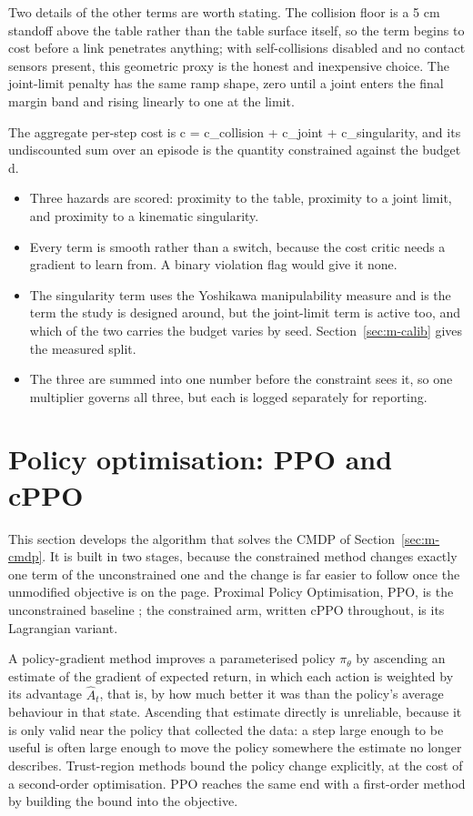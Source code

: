 Two details of the other terms are worth stating. The collision floor is a 5 cm standoff above the
table rather than the table surface itself, so the term begins to cost before a link penetrates
anything; with self-collisions disabled and no contact sensors present, this geometric proxy is the
honest and inexpensive choice. The joint-limit penalty has the same ramp shape, zero until a joint
enters the final margin band and rising linearly to one at the limit.

The aggregate per-step cost is c = c\_collision + c\_joint + c\_singularity, and its undiscounted sum
over an episode is the quantity constrained against the budget d.

\begin{keypoints}
\begin{itemize}\tightlist
\item Three hazards are scored: proximity to the table, proximity to a joint limit, and proximity to
a kinematic singularity.
\item Every term is smooth rather than a switch, because the cost critic needs a gradient to learn
from. A binary violation flag would give it none.
\item The singularity term uses the Yoshikawa manipulability measure and is the term the study is
designed around, but the joint-limit term is active too, and which of the two carries the budget
varies by seed. Section~\ref{sec:m-calib} gives the measured split.
\item The three are summed into one number before the constraint sees it, so one multiplier governs
all three, but each is logged separately for reporting.
\end{itemize}
\end{keypoints}

\section{Policy optimisation: PPO and cPPO}\label{sec:m-cppo}

This section develops the algorithm that solves the CMDP of Section~\ref{sec:m-cmdp}. It is built in
two stages, because the constrained method changes exactly one term of the unconstrained one and the
change is far easier to follow once the unmodified objective is on the page. Proximal Policy
Optimisation, PPO, is the unconstrained baseline \cite{schulman2017ppo}; the constrained arm,
written cPPO throughout, is its Lagrangian variant.

A policy-gradient method improves a parameterised policy \(\pi_\theta\) by ascending an estimate of
the gradient of expected return, in which each action is weighted by its advantage \(\hat{A}_t\),
that is, by how much better it was than the policy's average behaviour in that state. Ascending that
estimate directly is unreliable, because it is only valid near the policy that collected the data: a
step large enough to be useful is often large enough to move the policy somewhere the estimate no
longer describes. Trust-region methods bound the policy change explicitly, at the cost of a
second-order optimisation. PPO reaches the same end with a first-order method by building the bound
into the objective.

